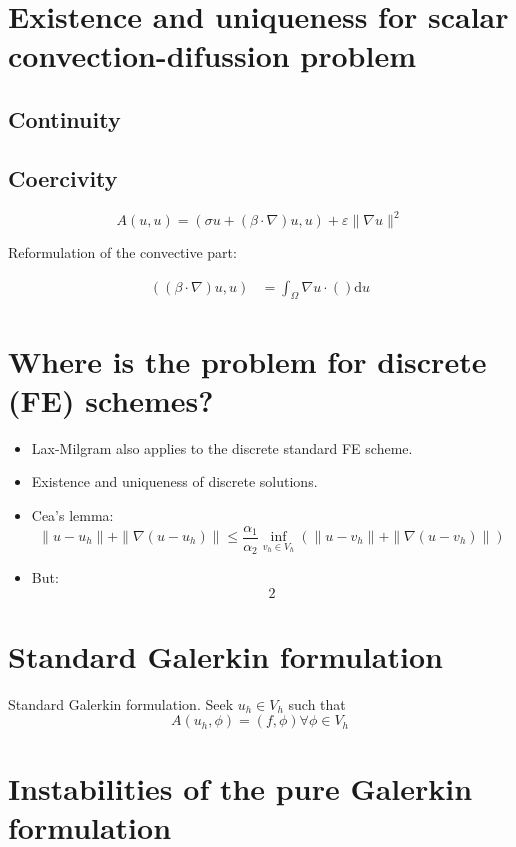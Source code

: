 \documentclass[openany,a4paper,11pt]{memoir}
\theoremstyle{definition}
\begin{document}
\section{Existence and uniqueness for scalar convection-difussion problem}

\subsection{Continuity}

\subsection{Coercivity}

\[ A(u,u)=(\sigma u + (\beta\cdot \nabla) u,u)+\varepsilon\|\nabla u\|^2 \]

Reformulation of the convective part:

\begin{align*}
  ((\beta\cdot\nabla)u,u) &=\int_{\Omega}\nabla u\cdot()\mathrm{d}u
\end{align*}

\section{Where is the problem for discrete (FE) schemes?}

\begin{itemize}
\item Lax-Milgram also applies to the discrete standard FE scheme.
  
\item Existence and uniqueness of discrete solutions.
  
\item Cea's lemma:
  \[ \|u-u_h\|+ \|\nabla(u-u_h)\|\leq \frac{\alpha_1}{\alpha_2}\inf_{v_h\in V_h}(\|u-v_h\|+\|\nabla(u-v_h)\|)\]
  
\item But:\[ 2 \]
\end{itemize}

\section{Standard Galerkin formulation}

Standard Galerkin formulation. Seek $u_h\in V_h$ such that \[ A(u_h,\phi)=(f,\phi) \forall \phi\in V_h \]

\section{Instabilities of the pure Galerkin formulation}
\end{document}
